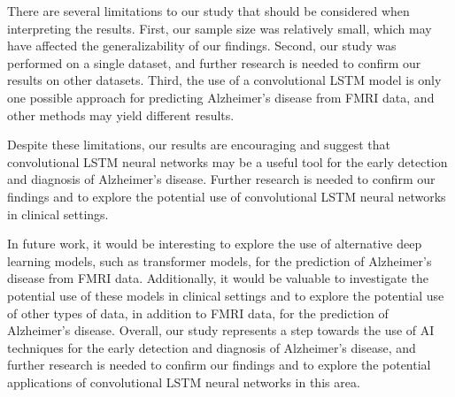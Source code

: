 \documentclass[10pt]{article}
\begin{document}
	There are several limitations to our study that should be considered when interpreting the results. First, our sample size was relatively small, which may have affected the generalizability of our findings. Second, our study was performed on a single dataset, and further research is needed to confirm our results on other datasets. Third, the use of a convolutional LSTM model is only one possible approach for predicting Alzheimer's disease from FMRI data, and other methods may yield different results.

	Despite these limitations, our results are encouraging and suggest that convolutional LSTM neural networks may be a useful tool for the early detection and diagnosis of Alzheimer's disease. Further research is needed to confirm our findings and to explore the potential use of convolutional LSTM neural networks in clinical settings.

	In future work, it would be interesting to explore the use of alternative deep learning models, such as transformer models, for the prediction of Alzheimer's disease from FMRI data. Additionally, it would be valuable to investigate the potential use of these models in clinical settings and to explore the potential use of other types of data, in addition to FMRI data, for the prediction of Alzheimer's disease. Overall, our study represents a step towards the use of AI techniques for the early detection and diagnosis of Alzheimer's disease, and further research is needed to confirm our findings and to explore the potential applications of convolutional LSTM neural networks in this area.

  
	
	
\end{document}
